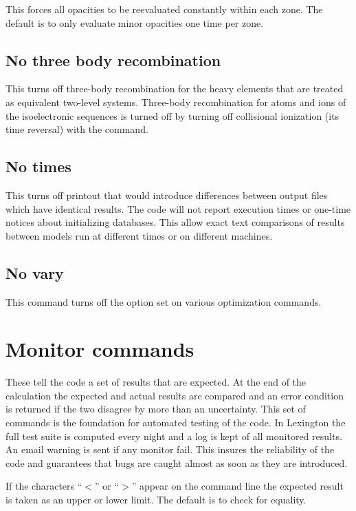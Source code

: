This forces all opacities to be reevaluated constantly within each zone.
The default is to only evaluate minor opacities one time per zone.

\subsection{No three body recombination}

This turns off three-body recombination for the heavy elements that are
treated as equivalent two-level systems.
Three-body recombination for atoms
and ions of the isoelectronic sequences is turned off by turning off
collisional ionization (its time reversal) with the
 command.

\subsection{No times}

This turns off printout that would introduce differences between 
output files which have identical results.
The code will not report execution times or one-time notices about initializing databases. 
This allow exact text comparisons of results between models run at
different times or on different machines.


\subsection{No vary}

This command turns off the  option set on
various optimization commands.

\section{Monitor commands}
\label{sec:CommandMonitor}

These tell the code a set of results that are expected.
At the end of
the calculation the expected and actual results are compared and an error
condition is returned if the two disagree by more than an uncertainty.
This set of commands is the foundation for automated testing of the code.
In Lexington the full test suite is computed every night and a log is kept
of all monitored results.
An email warning is sent if any monitor fail.
This insures the reliability of the code and guarantees that bugs are caught
almost as soon as they are introduced.

If the characters ``$<$'' or ``$>$'' appear on the
command line the expected result is taken as an upper or lower limit.
The default is to check for equality.

